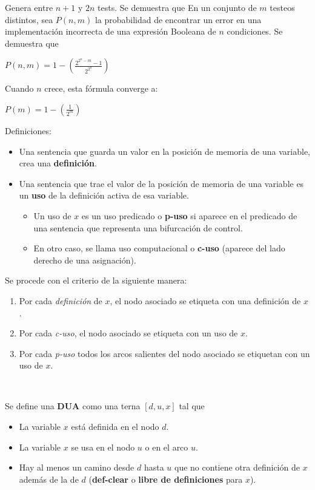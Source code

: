 \documentclass[]{article}
\begin{document}
Genera entre $n+1$ y $2n$ tests. Se demuestra que
En un conjunto de $m$ testeos distintos, sea $P(n,m)$ la probabilidad de encontrar un error en una implementación incorrecta de una expresión Booleana de $n$ condiciones. Se demuestra que
\begin{center}
	$\displaystyle P(n,m) = 1 - \left(\frac{2^{2^n-m}-1}{2^{2^n}}\right)$
\end{center}

Cuando $n$ crece, esta fórmula converge a:
\begin{center}
	$\displaystyle P(m) = 1-\left(\frac{1}{2^m}\right)$
\end{center}

Definiciones:
\begin{itemize}
	\item Una sentencia que guarda un valor en la posición de memoria de una variable, crea una \textbf{definición}.
	\item Una sentencia que trae el valor de la posición de memoria de una variable es un \textbf{uso} de la definición activa de esa variable.
	\begin{itemize}
		\item Un uso de $x$ es un uso predicado o \textbf{p-uso} si aparece en el predicado de una sentencia que representa una bifurcación de control.
		\item En otro caso, se llama uso computacional o \textbf{c-uso} (aparece del lado derecho de una asignación).
	\end{itemize}
\end{itemize}

Se procede con el criterio de la siguiente manera:
\begin{enumerate}
	\item Por cada \textit{definición} de $x$, el nodo asociado se etiqueta con una definición de $x$.
	\item Por cada \textit{c-uso}, el nodo asociado se etiqueta con un uso de $x$.
	\item Por cada \textit{p-uso} todos los arcos salientes del nodo asociado se etiquetan con un uso de $x$.
\end{enumerate}

~\newline

Se define una \textbf{DUA} como una terna $[d, u, x]$ tal que
\begin{itemize}
	\item La variable $x$ está definida en el nodo $d$.
	\item La variable $x$ se usa en el nodo $u$ o en el arco $u$.
	\item Hay al menos un camino desde $d$ hasta $u$ que no contiene otra definición de $x$ además de la de $d$ (\textbf{def-clear} o \textbf{libre de definiciones} para $x$).
\end{itemize}
\end{document}
